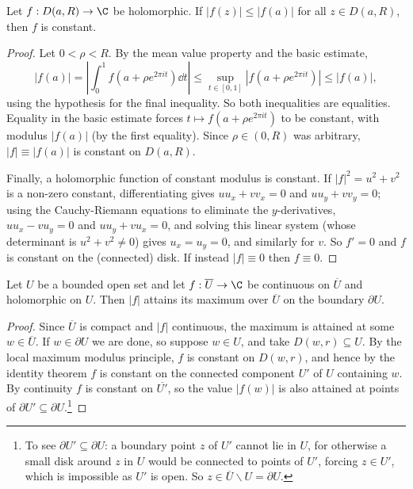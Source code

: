 \begin{theorem}
    Let $f: D(a, R) \rightarrow \C$ be holomorphic. If $|f(z)| \leq |f(a)|$ for all $z \in D(a, R)$, then $f$ is constant.
\end{theorem}
\begin{proof}
    Let $0 < \rho < R$. By the mean value property and the basic estimate,
    $$
    |f(a)| = \left|\int_0^1 f(a + \rho e^{2 \pi i t}) \dd t\right| \leq \sup_{t \in [0, 1]}|f(a + \rho e^{2 \pi i t})| \leq |f(a)|,
    $$
    using the hypothesis for the final inequality. So both inequalities are equalities. Equality in the basic estimate forces $t \mapsto f(a + \rho e^{2 \pi i t})$ to be constant, with modulus $|f(a)|$ (by the first equality). Since $\rho \in (0, R)$ was arbitrary, $|f| \equiv |f(a)|$ is constant on $D(a, R)$.

    Finally, a holomorphic function of constant modulus is constant. If $|f|^2 = u^2 + v^2$ is a non-zero constant, differentiating gives $u u_x + v v_x = 0$ and $u u_y + v v_y = 0$; using the Cauchy-Riemann equations to eliminate the $y$-derivatives, $u u_x - v u_y = 0$ and $u u_y + v u_x = 0$, and solving this linear system (whose determinant is $u^2 + v^2 \neq 0$) gives $u_x = u_y = 0$, and similarly for $v$. So $f' = 0$ and $f$ is constant on the (connected) disk. If instead $|f| \equiv 0$ then $f \equiv 0$.
\end{proof}

\begin{corollary}
    Let $U$ be a bounded open set and let $f: \overline{U} \rightarrow \C$ be continuous on $\overline{U}$ and holomorphic on $U$. Then $|f|$ attains its maximum over $\overline{U}$ on the boundary $\partial U$.
\end{corollary}
\begin{proof}
    Since $\overline{U}$ is compact and $|f|$ continuous, the maximum is attained at some $w \in \overline{U}$. If $w \in \partial U$ we are done, so suppose $w \in U$, and take $D(w, r) \subseteq U$. By the local maximum modulus principle, $f$ is constant on $D(w, r)$, and hence by the identity theorem $f$ is constant on the connected component $U'$ of $U$ containing $w$. By continuity $f$ is constant on $\overline{U'}$, so the value $|f(w)|$ is also attained at points of $\partial U' \subseteq \partial U$.\footnote{To see $\partial U' \subseteq \partial U$: a boundary point $z$ of $U'$ cannot lie in $U$, for otherwise a small disk around $z$ in $U$ would be connected to points of $U'$, forcing $z \in U'$, which is impossible as $U'$ is open. So $z \in \overline{U} \backslash U = \partial U$.}
\end{proof}

